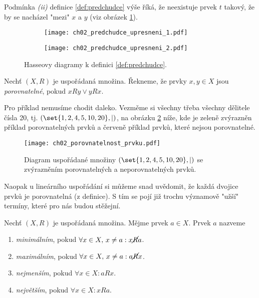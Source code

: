 Podmínka \textit{(ii)} definice \ref{def:predchudce} výše říká, že neexistuje prvek $t$ takový, že by se nacházel "mezi" $x$ a $y$ (viz obrázek \ref{fig:predchudce_upresneni}).
\begin{figure}[H]
    \centering
    \begin{subfigure}{6cm}
        \centering
        \texttt{[image: ch02\_predchudce\_upresneni\_1.pdf]}
    \end{subfigure}
    \qquad
    \begin{subfigure}{6cm}
        \centering
        \texttt{[image: ch02\_predchudce\_upresneni\_2.pdf]}
    \end{subfigure}
    \caption{Hasseovy diagramy k definici \ref{def:predchudce}.}
    \label{fig:predchudce_upresneni}
\end{figure}
\begin{definition}\label{def:porovnatelnost}
    Nechť $(X,R)$ je uspořádaná množina. Řekneme, že prvky $x,y\in X$ jsou \emph{porovnatelné}, pokud $xRy \lor yRx$.
\end{definition}
Pro příklad nemusíme chodit daleko. Vezměme si všechny třeba všechny dělitele čísla 20, tj. $(\set{1,2,4,5,10,20},\mid)$, na obrázku \ref{fig:porovnatelnost_prvku} níže, kde je zeleně zvýrazněn příklad porovnatelných prvků a červeně příklad prvků, které nejsou porovnatelné.
\begin{figure}[H]
    \centering
    \texttt{[image: ch02\_porovnatelnost\_prvku.pdf]}
    \caption{Diagram uspořádané množiny $(\set{1,2,4,5,10,20},\mid)$ se zvýrazněním porovnatelných a neporovnatelných prvků.}
    \label{fig:porovnatelnost_prvku}
\end{figure}
Naopak u lineárního uspořádání si můžeme snad uvědomit, že každá dvojice prvků je porovnatelná (z definice). S tím se pojí již trochu významově "užší" termíny, které pro nás budou stěžejní.
\begin{definition}
    Nechť $(X,R)$ je uspořádaná množina. Mějme prvek $a\in X$. Prvek $a$ nazveme
    \begin{enumerate}[label=(\roman*)]
        \item \emph{minimálním}, pokud $\forall x\in X,\,x\neq a: x\cancel{R}a$.
        \item \emph{maximálním}, pokud $\forall x\in X,\,x\neq a: a\cancel{R}x$.
        \item \emph{nejmenším}, pokud $\forall x\in X: aRx$.
        \item \emph{největším}, pokud $\forall x\in X: xRa$.
    \end{enumerate}
\end{definition}
